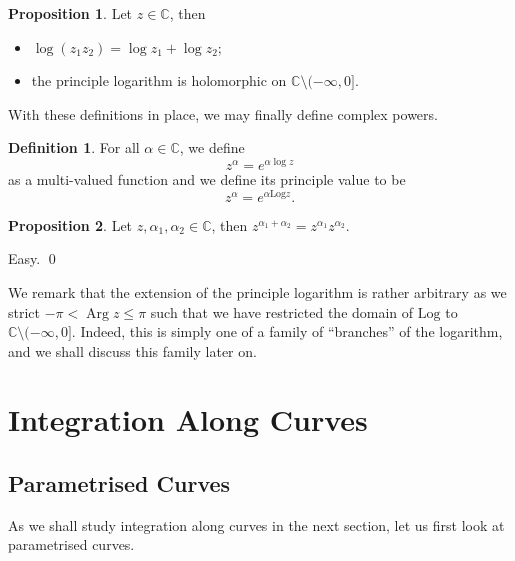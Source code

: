 \documentclass[
]{article}
\theoremstyle{definition}
\newtheorem{prop}{Proposition}
\theoremstyle{definition}
\newtheorem{definition}{Definition}[section]
\begin{document}
\begin{prop}
  Let \(z \in \mathbb{C}\), then 
  \begin{itemize}
    \item \(\log(z_1 z_2) = \log z_1 + \log z_2\);
    \item  the principle logarithm is holomorphic on \(\mathbb{C} \setminus (-\infty, 0]\).
  \end{itemize}
\end{prop}

With these definitions in place, we may finally define complex powers.

\begin{definition}
  For all \(\alpha \in \mathbb{C}\), we define 
  \[z^\alpha = e^{\alpha \log z}\]
  as a multi-valued function and we define its principle value to be 
  \[z^\alpha = e^{\alpha \text{Log} z}.\]
\end{definition}
\begin{prop}
  Let \(z, \alpha_1, \alpha_2 \in \mathbb{C}\), then 
  \(z^{\alpha_1 + \alpha_2} = z^{\alpha_1}z^{\alpha_2}\).
\end{prop}
\proof

Easy. \qed

We remark that the extension of the principle logarithm is rather
arbitrary as we strict \(- \pi < \mathop{\mathrm{Arg}}z \le \pi\) such
that we have restricted the domain of \(\text{Log}\) to
\(\mathbb{C} \setminus (-\infty, 0]\). Indeed, this is simply one of a
family of ``branches'' of the logarithm, and we shall discuss this
family later on.

\newpage

\hypertarget{integration-along-curves}{%
\section{Integration Along Curves}\label{integration-along-curves}}

\hypertarget{parametrised-curves}{%
\subsection{Parametrised Curves}\label{parametrised-curves}}

As we shall study integration along curves in the next section, let us
first look at parametrised curves.
\end{document}
